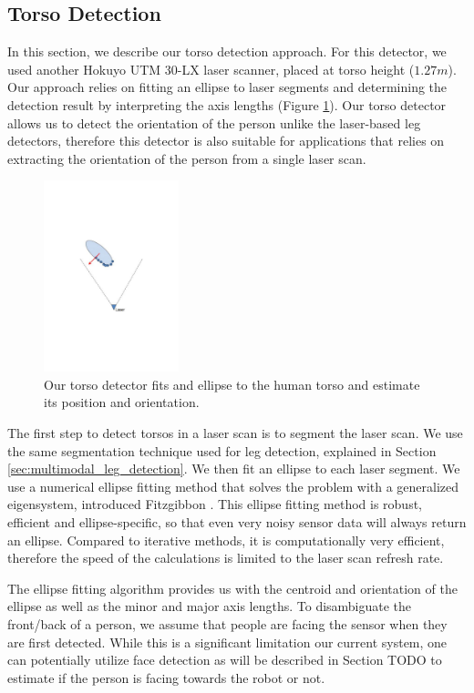 \subsection{Torso Detection}
\label{sec:multimodal_torso_detection}

In this section, we describe our torso detection approach. For this detector, we used another Hokuyo UTM 30-LX laser scanner, placed at torso height ($1.27m$). Our approach relies on fitting an ellipse to laser segments and determining the detection result by interpreting the axis lengths (Figure \ref{fig:ellipse}). Our torso detector allows us to detect the orientation of the person unlike the laser-based leg detectors, therefore this detector is also suitable for applications that relies on extracting the orientation of the person from a single laser scan. 

\begin{figure}[ht!]
\centering
\includegraphics[width=0.35\textwidth]{pics/ellipse}
\caption{Our torso detector fits and ellipse to the human torso and estimate its position and orientation.}
\label{fig:ellipse}
\end{figure}

The first step to detect torsos in a laser scan is to segment the laser scan. We use the same segmentation technique used for leg detection, explained in Section \ref{sec:multimodal_leg_detection}. We then fit an ellipse to each laser segment. We use a numerical ellipse fitting method that solves the problem with a generalized eigensystem, introduced Fitzgibbon \cite{fitzgibbon1999direct}. This ellipse fitting method is robust, efficient and ellipse-specific, so that even very noisy sensor data will always return an ellipse. Compared to iterative methods, it is computationally very efficient, therefore the speed of the calculations is limited to the laser scan refresh rate.

The ellipse fitting algorithm provides us with the centroid and orientation of the ellipse as well as the minor and major axis lengths. To disambiguate the front/back of a person, we assume that people are facing the sensor when they are first detected. While this is a significant limitation our current system, one can potentially utilize face detection as will be described in Section TODO to estimate if the person is facing towards the robot or not.


